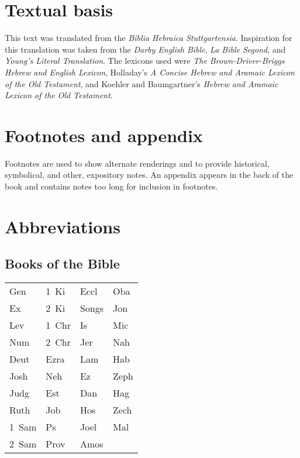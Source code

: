 \section{Textual basis}
This text was translated from the \emph{Biblia Hebraica Stuttgartensia}. Inspiration for this translation was taken from the \textit{Darby English Bible}, \textit{La Bible Segond}, and \textit{Young's Literal Translation}. The lexicons used were \emph{The Brown-Driver-Briggs Hebrew and English Lexicon}, Holladay's \emph{A Concise Hebrew and Aramaic Lexicon of the Old Testament}, and Koehler and Baumgartner's \emph{Hebrew and Aramaic Lexicon of the Old Testament}.

\section{Footnotes and appendix}
Footnotes are used to show alternate renderings and to provide historical, symbolical, and other, expository notes. An appendix appears in the back of the book and contains notes too long for inclusion in footnotes.

\section{Abbreviations}
\subsection{Books of the Bible}
\begin{table}[!h]
    \centering
    \setlength\tabcolsep{1.75em}
    \begin{tabular}{llll}
        Gen   & 1~Ki  & Eccl  & Oba  \\
        Ex    & 2~Ki  & Songs & Jon  \\
        Lev   & 1~Chr & Is    & Mic  \\
        Num   & 2~Chr & Jer   & Nah  \\
        Deut  & Ezra  & Lam   & Hab  \\
        Josh  & Neh   & Ez    & Zeph \\
        Judg  & Est   & Dan   & Hag  \\
        Ruth  & Job   & Hos   & Zech \\
        1~Sam & Ps    & Joel  & Mal  \\
        2~Sam & Prov  & Amos  & ~
    \end{tabular}
\end{table}

